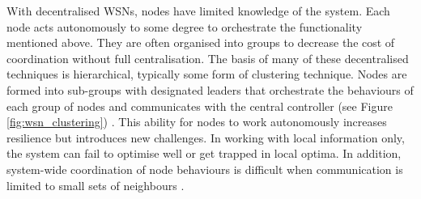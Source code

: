 \ifdefined\DEBUG {} \else \fi
With decentralised WSNs, nodes have limited knowledge of the system. Each node acts autonomously to some degree to orchestrate the functionality mentioned above. They are often organised into groups to decrease the cost of coordination without full centralisation. The basis of many of these decentralised techniques is hierarchical, typically some form of clustering technique. Nodes are formed into sub-groups with designated leaders that orchestrate the behaviours of each group of nodes and communicates with the central controller (see Figure \ref{fig:wsn_clustering}) . This ability for nodes to work autonomously increases resilience but introduces new challenges. In working with local information only, the system can fail to optimise well or get trapped in local optima. In addition, system-wide coordination of node behaviours is difficult when communication is limited to small sets of neighbours \citep{Carlos-Mancilla2016}.
